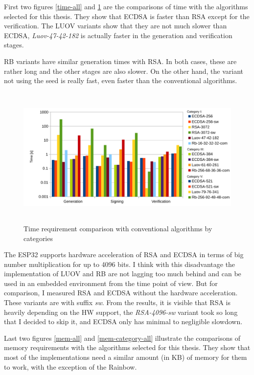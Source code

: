 \documentclass[thesis=M,english]{FITthesis}[2019/12/23]
\begin{document}
\noindent
First two figures \ref{time-all} and \ref{time-category-all} are the comparisons of time with the algorithms selected for this thesis. They show that ECDSA is faster than RSA except for the verification. The LUOV variants show that they are not much slower than ECDSA, \textit{Luov-47-42-182} is actually faster in the generation and verification stages. 

\bigskip
\noindent
RB variants have similar generation times  with RSA. In both cases, these are rather long and the other stages are also slower. On the other hand, the variant not using the seed is really fast, even faster than the conventional algorithms. 

\begin{figure}[H]
\centering
\includegraphics[width=13cm,height=7cm]{images/time-category-all.pdf}
\caption{Time requirement comparison with conventional algorithms by categories}
\label{time-category-all}
\end{figure}

\noindent
The ESP32 supports hardware acceleration of RSA and ECDSA in terms of big number multiplication for up to 4096 bits. I think with this disadvantage the implementation of LUOV and RB are not lagging too much behind and can be used in an embedded environment from the time point of view. But for comparison, I measured RSA and ECDSA without the hardware acceleration. These variants are with suffix \textit{sw}. From the results, it is visible that RSA is heavily depending on the HW support, the \textit{RSA-4096-sw} variant took so long that I decided to skip it, and ECDSA only has minimal to negligible slowdown. 

\bigskip
\noindent
Last two figures \ref{mem-all} and \ref{mem-category-all} illustrate the comparisons of memory requirements with the algorithms selected for this thesis. They show that most of the implementations need a similar amount (in KB) of memory for them to work, with the exception of the Rainbow. 
\end{document}
